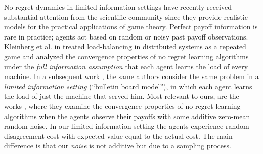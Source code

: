 No regret dynamics in limited information settings have recently received
substantial attention from the scientific community since they provide
realistic models for the practical applications of game theory.  Perfect payoff
information is rare in practice; agents act based on random or noisy past
payoff observations.  Kleinberg et al. in \cite{KPT09} treated load-balancing
in distributed systems as a repeated game and analyzed the convergence
properties of no regret learning algorithms under the \emph{full information
  assumption} that each agent learns the load of every machine.  In a
subsequent work \cite{KPT11}, the same authors consider the same problem in a
\emph{limited information setting} (\enquote{bulletin board model}), in which
each agent learns the load of just the machine that served him. Most relevant
to ours, are the works \cite{HCM17,MS17,BM17,CHM17}, where they examine the
convergence properties of no regret learning algorithms when the agents observe
their payoffs with some additive zero-mean random noise. In our limited
information setting the agents experience random disagreement cost with
expected value equal to the actual cost.  The main difference is that our
\emph{noise} is not additive but due to a sampling process.
